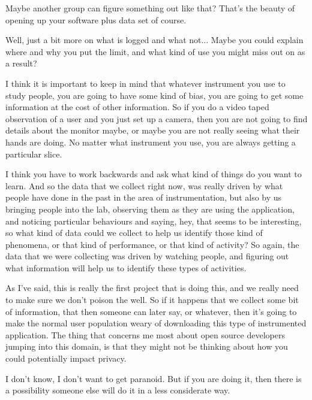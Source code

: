 { Maybe another group can figure something out like that? That's the
beauty of opening up your software plus data set of course.\par

Well, just a bit more on what is logged and what not... Maybe you could
explain where and why you put the limit, and what kind of use you might
miss out on as a result?\par

 I think it is important to keep in mind that whatever instrument
you use to study people, you are going to have some kind of bias, you
are going to get some information at the cost of other information. So
if you do a video taped observation of a user and you just set up a
camera, then you are not going to find details about the monitor maybe,
or maybe you are not really seeing what their hands are doing. No
matter what instrument you use, you are always getting a particular
slice.\par

I think you have to work backwards and ask what kind of things do you
want to learn. And so the data that we collect right now, was really
driven by what people have done in the past in the area of
instrumentation, but also by us bringing people into the lab, observing
them as they are using the application, and noticing particular
behaviours and saying, hey, that seems to be interesting, so what kind
of data could we collect to help us identify those kind of phenomena,
or that kind of performance, or that kind of activity? So again, the
data that we were collecting was driven by watching people, and
figuring out what information will help us to identify these types of
activities.\par

As I've said, this is really the first project that is doing this, and
we really need to make sure we don't poison the well. So if it happens
that we collect some bit of information, that then someone can later
say,  or whatever, then it's going to make the
normal user population weary of downloading this type of instrumented
application. The thing that concerns me most about open source
developers jumping into this domain, is that they might not be thinking
about how you could potentially impact privacy.\par 

 I don't know, I don't want to get paranoid. But if you are doing
it, then there is a possibility someone else will do it in a less
considerate way.\par 

}
